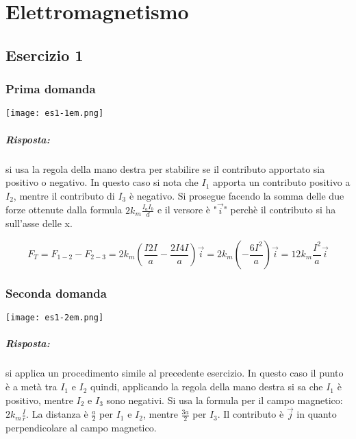 \chapter{Elettromagnetismo}

\section{Esercizio 1}

\subsection{Prima domanda}

\begin{center}
  \texttt{[image: es1-1em.png]}
\end{center}

\paragraph{Risposta:} si usa la regola della mano destra per stabilire se il contributo apportato sia positivo o negativo. In questo caso si nota che $I_1$ apporta un contributo positivo a $I_2$, mentre il contributo di $I_3$ è negativo. Si prosegue facendo la somma delle due forze ottenute dalla formula $2k_m \frac{I_a I_b}{d}$ e il versore è "$\vec{i}$" perchè il contributo si ha sull'asse delle x.

$$F_T = F_{1-2} - F_{2-3} = 2k_m (\frac{I 2I}{a} - \frac{2I 4I}{a}) \vec{i} = 2k_m (-\frac{6I^2}{a}) \vec{i} = 12k_m \frac{I^2}{a} \vec{i}$$

\subsection{Seconda domanda}

\begin{center}
  \texttt{[image: es1-2em.png]}
\end{center}

\paragraph{Risposta:} si applica un procedimento simile al precedente esercizio. In questo caso il punto è a metà tra $I_1$ e $I_2$ quindi, applicando la regola della mano destra si sa che $I_1$ è positivo, mentre $I_2$ e $I_3$ sono negativi. Si usa la formula per il campo magnetico: $2k_m\frac{I}{r}$. La distanza è $\frac{a}{2}$ per $I_1$ e $I_2$, mentre $\frac{3a}{2}$ per $I_3$. Il contributo è $\vec{j}$ in quanto perpendicolare al campo magnetico. 

